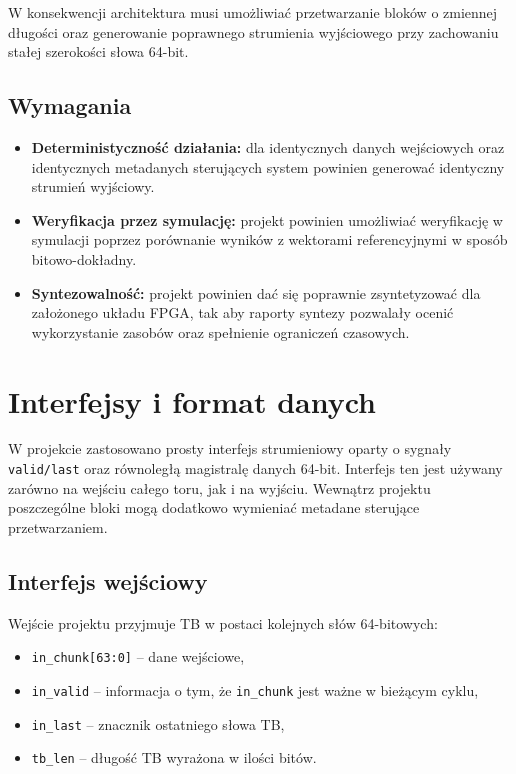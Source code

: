 W konsekwencji architektura musi umożliwiać przetwarzanie bloków o zmiennej długości oraz generowanie poprawnego strumienia wyjściowego przy zachowaniu stałej szerokości słowa 64-bit.

\subsection{Wymagania}

\begin{itemize}
    \item \textbf{Deterministyczność działania:} dla identycznych danych wejściowych oraz identycznych metadanych sterujących system powinien generować identyczny strumień wyjściowy.
    \item \textbf{Weryfikacja przez symulację:} projekt powinien umożliwiać weryfikację w symulacji poprzez porównanie wyników z wektorami referencyjnymi w sposób bitowo-dokładny.
    \item \textbf{Syntezowalność:} projekt powinien dać się poprawnie zsyntetyzować dla założonego układu FPGA, tak aby raporty syntezy pozwalały ocenić wykorzystanie zasobów oraz spełnienie ograniczeń czasowych.

\end{itemize}


\section{Interfejsy i format danych}
\label{sec:interfejsy_i_format_danych}

W projekcie zastosowano prosty interfejs strumieniowy oparty o sygnały \texttt{valid/last} oraz równoległą magistralę danych 64-bit. Interfejs ten jest używany zarówno na wejściu całego toru, jak i na wyjściu. Wewnątrz projektu poszczególne bloki mogą dodatkowo wymieniać metadane sterujące przetwarzaniem.

\subsection{Interfejs wejściowy}
\label{subsec:interfejs_wej}

Wejście projektu przyjmuje TB w postaci kolejnych słów 64-bitowych:
\begin{itemize}
    \item \texttt{in\_chunk[63:0]} -- dane wejściowe,
    \item \texttt{in\_valid} -- informacja o tym, że \texttt{in\_chunk} jest ważne w bieżącym cyklu,
    \item \texttt{in\_last} -- znacznik ostatniego słowa TB,
    \item \texttt{tb\_len} -- długość TB wyrażona w ilości bitów.
\end{itemize}

